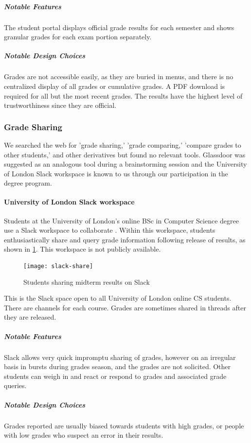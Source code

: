 \subparagraph{Notable Features}
The student portal displays official grade results for each semester and shows granular grades for each exam portion separately.

\subparagraph{Notable Design Choices}
Grades are not accessible easily, as they are buried in menus, and there is no centralized display of all grades or cumulative grades. A PDF download is required for all but the most recent grades. The results have the highest level of trustworthiness since they are official.

\subsubsection{Grade Sharing}

We searched the web for 'grade sharing,' 'grade comparing,' 'compare grades to other students,' and other derivatives but found no relevant tools. Glassdoor was suggested as an analogous tool during a brainstorming session and the University of London Slack workspace is known to us through our participation in the degree program.

\paragraph{University of London Slack workspace}

Students at the University of London's online BSc in Computer Science degree use a Slack workspace to collaborate \cite{slack}. Within this workspace, students enthusiastically share and query grade information following release of results, as shown in \cref{fig:slack-share}. This workspace is not publicly available.

\begin{figure}[H]
\noindent \texttt{[image: slack-share]}
\centering
\caption{Students sharing midterm results on Slack}
\label{fig:slack-share}
\end{figure}

\noindent This is the Slack space open to all University of London online CS students. There are channels for each course. Grades are sometimes shared in threads after they are released.
\bigskip

\subparagraph{Notable Features}
Slack allows very quick impromptu sharing of grades, however on an irregular basis in bursts during grades season, and the grades are not solicited. Other students can weigh in and react or respond to grades and associated grade queries.

\subparagraph{Notable Design Choices}
Grades reported are usually biased towards students with high grades, or people with low grades who suspect an error in their results.

